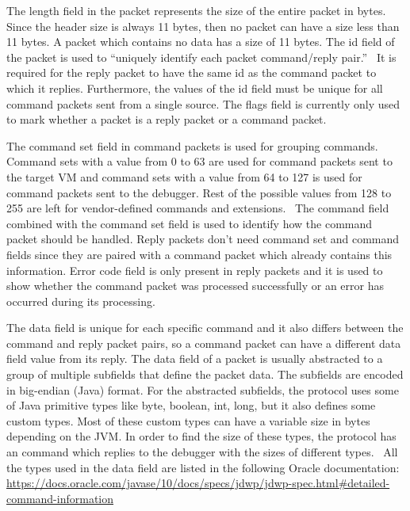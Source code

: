 \documentclass[..thesis.tex]{subfiles}
\begin{document}
The length field in the packet represents the size of the entire packet in bytes. 
Since the header size is always 11 bytes, then no packet can have a size less than 11 bytes.
A packet which contains no data has a size of 11 bytes.
The id field of the packet is used to \enquote{uniquely identify each packet command/reply pair.}~\cite{oracle_jdwp_spec}
It is required for the reply packet to have the same id as the command packet to which it replies.
Furthermore, the values of the id field must be unique for all command packets sent from a single source.
The flags field is currently only used to mark whether a packet is a reply packet or a command packet.

The command set field in command packets is used for grouping commands. 
Command sets with a value from 0 to 63 are used for command packets sent to the target VM and command sets with a value from 64 to 127 is used for command packets sent to the debugger. Rest of the possible values from 128 to 255 are left for vendor-defined commands and extensions.~\cite{oracle_jdwp_spec}
The command field combined with the command set field is used to identify how the command packet should be handled. 
Reply packets don't need command set and command fields since they are paired with a command packet which already contains this information.
Error code field is only present in reply packets and it is used to show whether the command packet was processed successfully or an error has occurred during its processing.

The data field is unique for each specific command and it also differs between the command and reply packet pairs, so a command packet can have a different data field value from its reply.
The data field of a packet is usually abstracted to a group of multiple subfields that define the packet data. The subfields are encoded in big-endian (Java) format.
For the abstracted subfields, the protocol uses some of Java primitive types like byte, boolean, int, long, but it also defines some custom types.
Most of these custom types can have a variable size in bytes depending on the JVM.
In order to find the size of these types, the protocol has an  command which replies to the debugger with the sizes of different types.~\cite{oracle_jdwp_spec}
All the types used in the data field are listed in the following Oracle documentation: \url{https://docs.oracle.com/javase/10/docs/specs/jdwp/jdwp-spec.html\#detailed-command-information}
\end{document}
